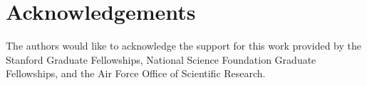 
\section*{Acknowledgements}

The authors would like to acknowledge the support for this work provided by the Stanford Graduate Fellowships, National Science Foundation Graduate Fellowships, and the Air Force Office of Scientific Research.